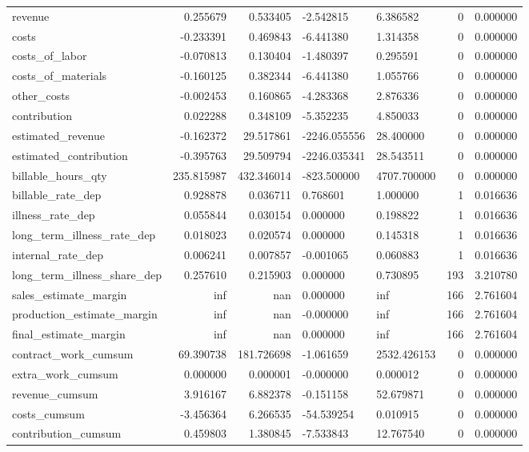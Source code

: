 \begin{landscape}
\begin{longtable}[h!]{lrrllrr}
revenue & 0.255679 & 0.533405 & -2.542815 & 6.386582 & 0 & 0.000000 \\
costs & -0.233391 & 0.469843 & -6.441380 & 1.314358 & 0 & 0.000000 \\
costs_of_labor & -0.070813 & 0.130404 & -1.480397 & 0.295591 & 0 & 0.000000 \\
costs_of_materials & -0.160125 & 0.382344 & -6.441380 & 1.055766 & 0 & 0.000000 \\
other_costs & -0.002453 & 0.160865 & -4.283368 & 2.876336 & 0 & 0.000000 \\
contribution & 0.022288 & 0.348109 & -5.352235 & 4.850033 & 0 & 0.000000 \\
estimated_revenue & -0.162372 & 29.517861 & -2246.055556 & 28.400000 & 0 & 0.000000 \\
estimated_contribution & -0.395763 & 29.509794 & -2246.035341 & 28.543511 & 0 & 0.000000 \\
billable_hours_qty & 235.815987 & 432.346014 & -823.500000 & 4707.700000 & 0 & 0.000000 \\
billable_rate_dep & 0.928878 & 0.036711 & 0.768601 & 1.000000 & 1 & 0.016636 \\
illness_rate_dep & 0.055844 & 0.030154 & 0.000000 & 0.198822 & 1 & 0.016636 \\
long_term_illness_rate_dep & 0.018023 & 0.020574 & 0.000000 & 0.145318 & 1 & 0.016636 \\
internal_rate_dep & 0.006241 & 0.007857 & -0.001065 & 0.060883 & 1 & 0.016636 \\
long_term_illness_share_dep & 0.257610 & 0.215903 & 0.000000 & 0.730895 & 193 & 3.210780 \\
sales_estimate_margin & inf & nan & 0.000000 & inf & 166 & 2.761604 \\
production_estimate_margin & inf & nan & -0.000000 & inf & 166 & 2.761604 \\
final_estimate_margin & inf & nan & 0.000000 & inf & 166 & 2.761604 \\
contract_work_cumsum & 69.390738 & 181.726698 & -1.061659 & 2532.426153 & 0 & 0.000000 \\
extra_work_cumsum & 0.000000 & 0.000001 & -0.000000 & 0.000012 & 0 & 0.000000 \\
revenue_cumsum & 3.916167 & 6.882378 & -0.151158 & 52.679871 & 0 & 0.000000 \\
costs_cumsum & -3.456364 & 6.266535 & -54.539254 & 0.010915 & 0 & 0.000000 \\
contribution_cumsum & 0.459803 & 1.380845 & -7.533843 & 12.767540 & 0 & 0.000000 \\

\end{longtable}
\end{landscape}
